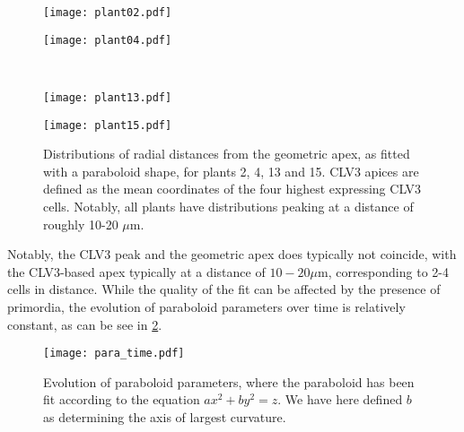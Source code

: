 \begin{figure}[H]
  \centering
  \begin{minipage}{.8\textwidth}
		\begin{minipage}[t]{0.49\textwidth}
      \centering
			\texttt{[image: plant02.pdf]} 
    \end{minipage}\hfill
		\begin{minipage}[t]{.49\textwidth}
      \centering
			\texttt{[image: plant04.pdf]} 
    \end{minipage}
  \end{minipage}\\
  \begin{minipage}{.8\textwidth}
		\begin{minipage}[t]{0.49\textwidth}
      \centering
			\texttt{[image: plant13.pdf]} 
    \end{minipage}\hfill
		\begin{minipage}[t]{.49\textwidth}
      \centering
			\texttt{[image: plant15.pdf]} 
    \end{minipage}
  \end{minipage}
	\caption[Comparison between geometric and genetic apex]{Distributions of
    radial distances from the geometric apex, as fitted with a paraboloid shape,
    for plants 2, 4, 13 and 15.
    CLV3 apices are defined as the mean coordinates of the four highest
    expressing CLV3 cells. Notably, all plants have distributions peaking at
    a distance of roughly 10-20 $\mu$m.
  }
  \label{fig:age_clusters}
\end{figure}
Notably, the CLV3 peak and the geometric apex does typically not coincide, with
the CLV3-based apex typically at a distance of $10-20\mu$m, corresponding to 2-4
cells in distance. While the quality of the fit can be affected by the presence
of primordia, the evolution of paraboloid parameters over time is relatively
constant, as can be see in \cref{fig:para_time}.

\begin{figure}[H]
  \centering
  \texttt{[image: para\_time.pdf]}
  \caption[Paraboloid time evolution]{Evolution of paraboloid parameters, where
    the paraboloid has been fit according to the equation $ax^2 + by^2 = z$. We
    have here defined $b$ as determining the axis of largest curvature.}
  \label{fig:para_time}
\end{figure}

